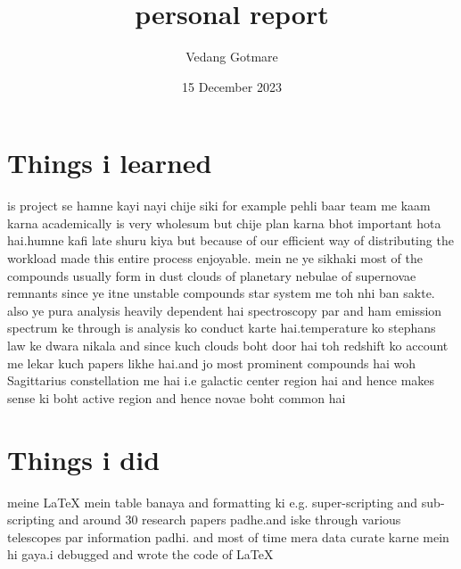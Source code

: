 \documentclass{article}
\title{personal report}
\author{Vedang Gotmare}
\date{15 December 2023}
\begin{document}
\maketitle

\section{Things i learned}
is project se hamne kayi nayi chije siki for example pehli baar team me kaam karna academically is very wholesum but chije plan karna bhot important hota hai.humne kafi late shuru kiya but because of our efficient way of distributing the workload made this entire process enjoyable. mein ne ye sikhaki most of the compounds usually form in dust clouds of planetary nebulae of supernovae remnants since ye itne unstable compounds star system me toh nhi ban sakte. also ye pura analysis heavily dependent hai spectroscopy par and ham emission spectrum ke through is analysis ko conduct karte hai.temperature ko stephans law ke dwara nikala and since kuch clouds boht door hai toh redshift ko account me lekar kuch papers likhe hai.and jo most prominent compounds hai woh Sagittarius constellation me hai i.e galactic center region hai and hence makes sense ki boht active region and hence novae boht common hai
\section{Things i did}
meine LaTeX mein table banaya and formatting ki e.g. super-scripting and sub-scripting and around 30 research papers padhe.and iske through various telescopes par information padhi. and most of time mera data curate karne mein hi gaya.i debugged and wrote the code of LaTeX
\end{document}
